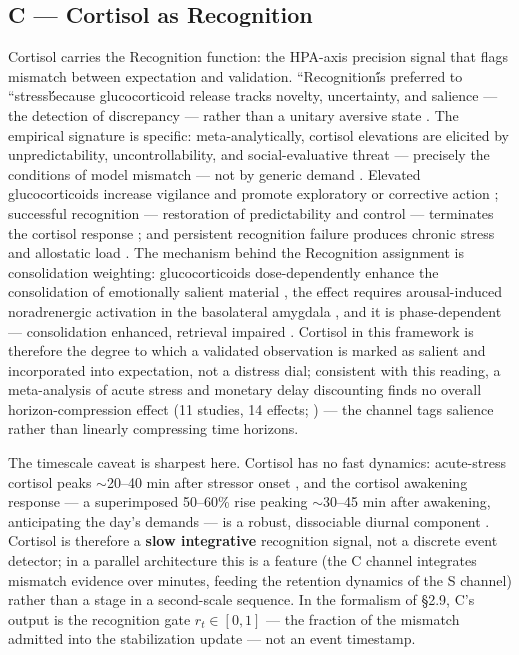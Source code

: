 \documentclass[11pt,twocolumn]{article}
\theoremstyle{plain}
\begin{document}
\subsection{C — Cortisol as Recognition}

Cortisol carries the Recognition function: the HPA-axis precision signal that flags mismatch between expectation and validation. ``Recognition\'\' is preferred to ``stress\'\' because glucocorticoid release tracks novelty, uncertainty, and salience — the detection of discrepancy — rather than a unitary aversive state \citep{ulrichlai2009}. The empirical signature is specific: meta-analytically, cortisol elevations are elicited by unpredictability, uncontrollability, and social-evaluative threat — precisely the conditions of model mismatch — not by generic demand \citep{dickerson2004}. Elevated glucocorticoids increase vigilance and promote exploratory or corrective action \citep{grupe2013}; successful recognition — restoration of predictability and control — terminates the cortisol response \citep{dickerson2004}; and persistent recognition failure produces chronic stress and allostatic load \citep{mcewen1998}. The mechanism behind the Recognition assignment is consolidation weighting: glucocorticoids dose-dependently enhance the consolidation of emotionally salient material \citep{buchanan2001}, the effect requires arousal-induced noradrenergic activation in the basolateral amygdala \citep{roozendaal2006}, and it is phase-dependent --- consolidation enhanced, retrieval impaired \citep{roozendaal2002}. Cortisol in this framework is therefore the degree to which a validated observation is marked as salient and incorporated into expectation, not a distress dial; consistent with this reading, a meta-analysis of acute stress and monetary delay discounting finds no overall horizon-compression effect (11 studies, 14 effects; \citealp{forbes2024}) --- the channel tags salience rather than linearly compressing time horizons.

The timescale caveat is sharpest here. Cortisol has no fast dynamics: acute-stress cortisol peaks $\sim$20–40 min after stressor onset \citep{dickerson2004}, and the cortisol awakening response — a superimposed 50–60\% rise peaking $\sim$30–45 min after awakening, anticipating the day's demands — is a robust, dissociable diurnal component \citep{fries2009,stalder2016}. Cortisol is therefore a \textbf{slow integrative} recognition signal, not a discrete event detector; in a parallel architecture this is a feature (the C channel integrates mismatch evidence over minutes, feeding the retention dynamics of the S channel) rather than a stage in a second-scale sequence. In the formalism of \S{}2.9, C's output is the recognition gate $r_t \in [0,1]$ — the fraction of the mismatch admitted into the stabilization update — not an event timestamp.
\end{document}
